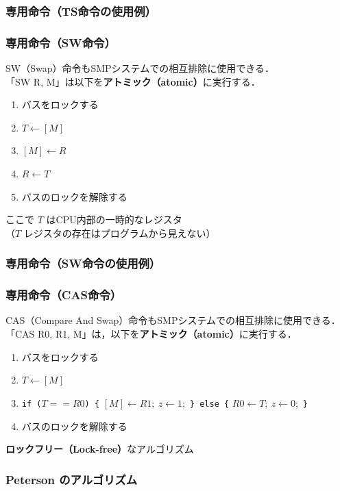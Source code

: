 \documentclass[dvipdfmx]{beamer}
\begin{document}
\begin{frame}
  \frametitle{専用命令（TS命令の使用例）}
  
\end{frame}

\begin{frame}
  \frametitle{専用命令（SW命令）}
  SW（Swap）命令もSMPシステムでの相互排除に使用できる．\\
  「SW  R, M」は以下を{\bf アトミック（atomic）}に実行する．
  \begin{enumerate}
  \item バスをロックする
  \item $T \leftarrow [M]$
  \item $[M] \leftarrow R$
  \item $R \leftarrow T$
  \item バスのロックを解除する
  \end{enumerate}
  ここで $T$ はCPU内部の一時的なレジスタ\\
  （$T$ レジスタの存在はプログラムから見えない）
\end{frame}

\begin{frame}
  \frametitle{専用命令（SW命令の使用例）}
  
\end{frame}

\begin{frame}
  \frametitle{専用命令（CAS命令）}
  CAS（Compare And Swap）命令もSMPシステムでの相互排除に使用できる．
  「CAS  R0, R1, M」は，以下を{\bf アトミック（atomic）}に実行する．
  \begin{enumerate}
  \item バスをロックする
  \item $T \leftarrow [M]$
  \item {\tt if ($T==R0$) \{} $[M] \leftarrow R1;~ z \leftarrow 1;$
    {\tt \} else \{} $R0 \leftarrow T;~  z \leftarrow 0;$ {\tt \}}
  \item バスのロックを解除する
  \end{enumerate}
  \vspace{1em}
  
  {\bf ロックフリー（Lock-free）}なアルゴリズム
\end{frame}

\begin{frame}
  \frametitle{Peterson のアルゴリズム}
  
\end{frame}
\end{document}
